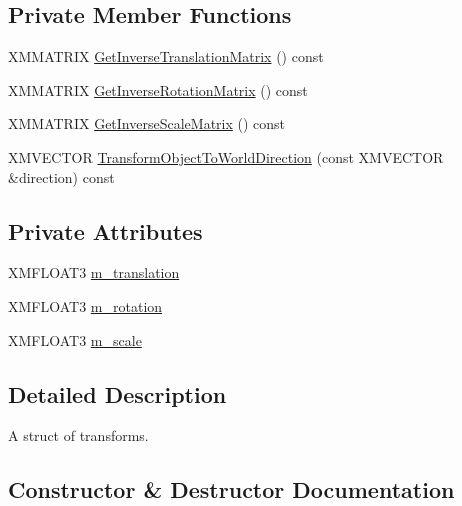\subsection*{Private Member Functions}
\begin{DoxyCompactItemize}
\item 
X\+M\+M\+A\+T\+R\+IX \hyperlink{structmage_1_1_transform_a4cd7f7143c49772a83adfbd1d75dd475}{Get\+Inverse\+Translation\+Matrix} () const
\item 
X\+M\+M\+A\+T\+R\+IX \hyperlink{structmage_1_1_transform_a12e7ee212a9270fb3f01de9b7f5ee3b8}{Get\+Inverse\+Rotation\+Matrix} () const
\item 
X\+M\+M\+A\+T\+R\+IX \hyperlink{structmage_1_1_transform_a31da6a53e73a6254bc36cd0348c65cda}{Get\+Inverse\+Scale\+Matrix} () const
\item 
X\+M\+V\+E\+C\+T\+OR \hyperlink{structmage_1_1_transform_a9771fc6768200e2b5cc9d425a334a1e7}{Transform\+Object\+To\+World\+Direction} (const X\+M\+V\+E\+C\+T\+OR \&direction) const
\end{DoxyCompactItemize}
\subsection*{Private Attributes}
\begin{DoxyCompactItemize}
\item 
X\+M\+F\+L\+O\+A\+T3 \hyperlink{structmage_1_1_transform_a57e27b28e0cf85be034055a68513ad79}{m\+\_\+translation}
\item 
X\+M\+F\+L\+O\+A\+T3 \hyperlink{structmage_1_1_transform_a037b4fb338bfe79aa2ab1a2e809c40df}{m\+\_\+rotation}
\item 
X\+M\+F\+L\+O\+A\+T3 \hyperlink{structmage_1_1_transform_a25d15c85b93037bab5b755c86bef0b54}{m\+\_\+scale}
\end{DoxyCompactItemize}


\subsection{Detailed Description}
A struct of transforms. 

\subsection{Constructor \& Destructor Documentation}
\hypertarget{structmage_1_1_transform_a1a4624639a7da3608738f52b8cfc6bf3}{}\label{structmage_1_1_transform_a1a4624639a7da3608738f52b8cfc6bf3} 
